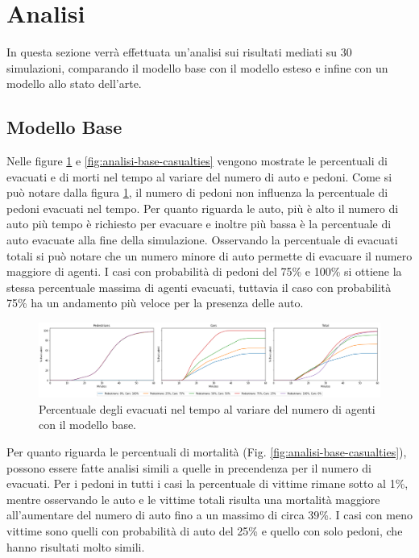 \section{Analisi}
\label{sec:analisi}
In questa sezione verrà effettuata un'analisi sui risultati mediati su 30 simulazioni,
comparando il modello base con il modello esteso e infine con un modello allo stato dell'arte.

\subsection{Modello Base}
Nelle figure \ref{fig:analisi-base-evacuated} e \ref{fig:analisi-base-casualties} vengono mostrate le percentuali di evacuati
e di morti nel tempo al variare del numero di auto e pedoni.
%
Come si può notare dalla figura \ref{fig:analisi-base-evacuated}, il numero di pedoni non influenza la percentuale di pedoni evacuati nel tempo.
%
Per quanto riguarda le auto, più è alto il numero di auto più tempo è richiesto per evacuare e inoltre più bassa è la percentuale di auto evacuate alla fine della simulazione.
%
Osservando la percentuale di evacuati totali si può notare che un numero minore di auto permette di evacuare il numero maggiore di agenti.
I casi con probabilità di pedoni del 75\% e 100\% si ottiene la stessa percentuale massima di agenti evacuati,
tuttavia il caso con probabilità 75\% ha un andamento più veloce per la presenza delle auto.

\begin{figure}[ht]
    \centering
    \includegraphics[width=\textwidth]{images/analisi/base-evacuated.png}
    \caption{Percentuale degli evacuati nel tempo al variare del numero di agenti con il modello base.}
    \label{fig:analisi-base-evacuated}
\end{figure}

Per quanto riguarda le percentuali di mortalità (Fig. \ref{fig:analisi-base-casualties}), possono essere fatte analisi simili a quelle in precendenza
per il numero di evacuati.
Per i pedoni in tutti i casi la percentuale di vittime rimane sotto al 1\%, mentre osservando le auto e le vittime totali
risulta una mortalità maggiore all'aumentare del numero di auto fino a un massimo di circa 39\%.
I casi con meno vittime sono quelli con probabilità di auto del 25\% e quello con solo pedoni, che hanno risultati molto simili.

